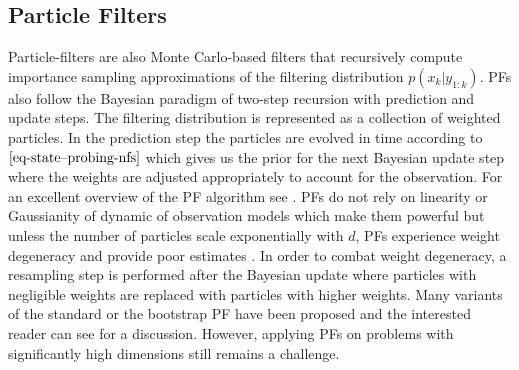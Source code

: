 \subsection{Particle Filters}\label{ssec-pf--probing-nfs}
Particle-filters are also Monte Carlo-based filters that recursively compute importance sampling approximations of the filtering distribution $p(x_k|y_{1:k})$. PFs also follow the Bayesian paradigm of two-step recursion with prediction and update steps. The filtering distribution is represented as a collection of weighted particles. In the prediction step the particles are evolved in time according to $\eqref{eq-state--probing-nfs}$ which gives us the prior for the next Bayesian update step where the weights are adjusted appropriately to account for the observation. For an excellent overview of the PF algorithm see \cite{doucet2009tutorial}. PFs do not rely on linearity or Gaussianity of dynamic of observation models which make them powerful but unless the number of particles scale exponentially with $d$, PFs experience weight degeneracy and provide poor estimates \cite{bengtsson1981dynamic}. In order to combat weight degeneracy, a resampling step is performed after the Bayesian update where particles with negligible weights are replaced with particles with higher weights. Many variants of the standard or the bootstrap PF have been proposed and the interested reader can see \cite{farchi2018comparison} for a discussion. However, applying PFs on problems with significantly high dimensions still remains a challenge. 

